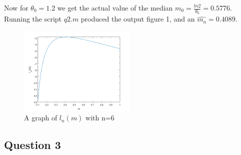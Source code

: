 \documentclass[10pt,a4paper]{report}
\begin{document}
Now for $\theta_0=1.2$ we get the actual value of the median $m_0=\frac{ln2}{\theta_0}=0.5776$. Running the script $q2.m$ produced the output figure 1, and an $\hat{m_n}=0.4089$.

\begin{figure}[ht]
\centering
\includegraphics[width=0.5\textwidth]{q2n6.png}
\caption{A graph of $l_n(m)$ with n=6}
\end{figure}

\subsection*{Question 3}
\end{document}
